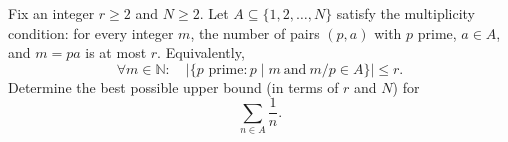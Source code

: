 Fix an integer $r\ge 2$ and $N\ge 2$.
Let $A\subseteq\{1,2,\dots,N\}$ satisfy the multiplicity condition:
for every integer $m$, the number of pairs $(p,a)$ with $p$ prime, $a\in A$, and $m=p a$ is at most $r$.
Equivalently,
\[
\forall m\in\mathbb N:\quad \bigl|\{p\text{ prime}: p\mid m\ \text{and}\ m/p\in A\}\bigr|\le r.
\]
Determine the best possible upper bound (in terms of $r$ and $N$) for
\[
\sum_{n\in A}\frac1n.
\]

